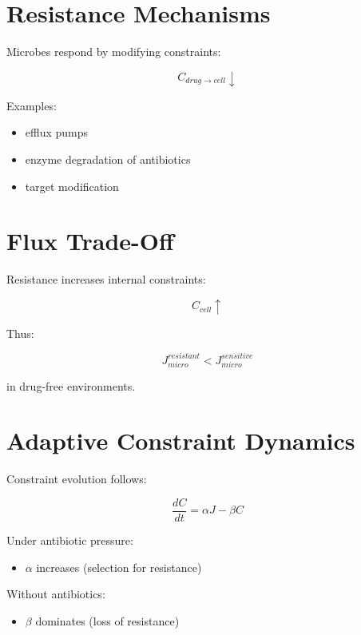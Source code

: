 \documentclass[11pt]{article}
\begin{document}
\section{Resistance Mechanisms}

Microbes respond by modifying constraints:

\begin{equation}
C_{drug \rightarrow cell} \downarrow
\end{equation}

Examples:

\begin{itemize}
    \item efflux pumps
    \item enzyme degradation of antibiotics
    \item target modification
\end{itemize}

\section{Flux Trade-Off}

Resistance increases internal constraints:

\begin{equation}
C_{cell} \uparrow
\end{equation}

Thus:

\begin{equation}
J_{micro}^{resistant} < J_{micro}^{sensitive}
\end{equation}

in drug-free environments.

\section{Adaptive Constraint Dynamics}

Constraint evolution follows:

\begin{equation}
\frac{dC}{dt} = \alpha J - \beta C
\end{equation}

Under antibiotic pressure:

\begin{itemize}
    \item $\alpha$ increases (selection for resistance)
\end{itemize}

Without antibiotics:

\begin{itemize}
    \item $\beta$ dominates (loss of resistance)
\end{itemize}
\end{document}
